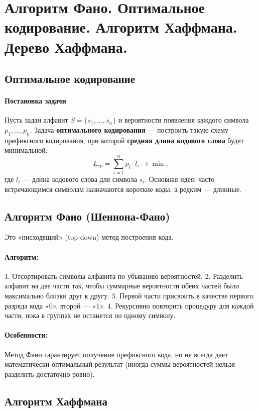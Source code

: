 \section{Алгоритм Фано. Оптимальное кодирование. Алгоритм Хаффмана. Дерево Хаффмана.}

\subsection*{Оптимальное кодирование}

\paragraph{Постановка задачи}
Пусть задан алфавит $S = \{s_1, \dots, s_n\}$ и вероятности появления каждого символа $p_1, \dots, p_n$. Задача \textbf{оптимального кодирования} — построить такую схему префиксного кодирования, при которой \textbf{средняя длина кодового слова} будет минимальной:
$$L_{cp} = \sum_{i=1}^n p_i \cdot l_i \to \min,$$
где $l_i$ — длина кодового слова для символа $s_i$. Основная идея: часто встречающимся символам назначаются короткие коды, а редким — длинные.

\subsection*{Алгоритм Фано (Шеннона-Фано)}

Это «нисходящий» (top-down) метод построения кода.

\paragraph{Алгоритм:}
1. Отсортировать символы алфавита по убыванию вероятностей.
2. Разделить алфавит на две части так, чтобы суммарные вероятности обеих частей были максимально близки друг к другу.
3. Первой части присвоить в качестве первого разряда кода «0», второй — «1».
4. Рекурсивно повторить процедуру для каждой части, пока в группах не останется по одному символу.

\paragraph{Особенности:}
Метод Фано гарантирует получение префиксного кода, но не всегда дает математически оптимальный результат (иногда суммы вероятностей нельзя разделить достаточно ровно).

\subsection*{Алгоритм Хаффмана}

